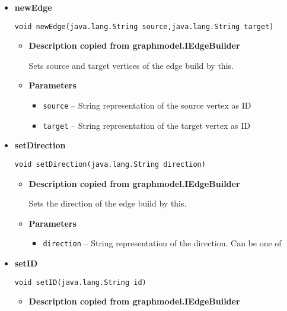 {{{{{{{{{{{{\begin{itemize}
{\begin{itemize}
{. Builds an Edge with the given Data and returns it.
}
\item{{\bf  Returns} -- 
The Edge that is being build by the IEdgeBuilder 
}%
\end{itemize}
}%
\item{ 
{\bf  newEdge}\\
\begin{lstlisting}[frame=none]
void newEdge(java.lang.String source,java.lang.String target)\end{lstlisting} %
\begin{itemize}
\item{
{\bf  Description copied from graphmodel.IEdgeBuilder{\small {}} }

Sets source and target vertices of the edge build by this.
}
\item{
{\bf  Parameters}
  \begin{itemize}
   \item{
\texttt{source} -- String representation of the source vertex as ID}
   \item{
\texttt{target} -- String representation of the target vertex as ID}
  \end{itemize}
}%
\end{itemize}
}%
\item{ 
{\bf  setDirection}\\
\begin{lstlisting}[frame=none]
void setDirection(java.lang.String direction)\end{lstlisting} %
\begin{itemize}
\item{
{\bf  Description copied from graphmodel.IEdgeBuilder{\small {}} }

Sets the direction of the edge build by this.
}
\item{
{\bf  Parameters}
  \begin{itemize}
   \item{
\texttt{direction} -- String representation of the direction. Can be one of}
  \end{itemize}
}%
\end{itemize}
}%
\item{ 
{\bf  setID}\\
\begin{lstlisting}[frame=none]
void setID(java.lang.String id)\end{lstlisting} %
\begin{itemize}
\item{
{\bf  Description copied from graphmodel.IEdgeBuilder{\small {}} }

}
\end{itemize}}
\end{itemize}}}}}}}}}}}}}
